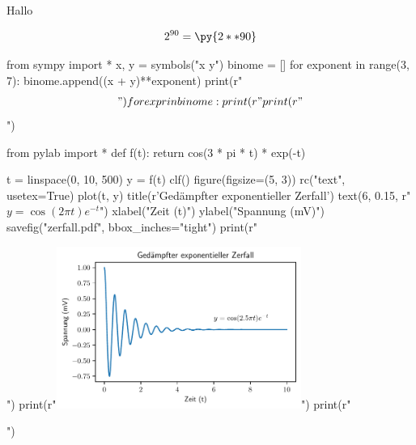 \documentclass[12pt,ngerman]{scrartcl}
\begin{document}
Hallo


\[
2^{90}=\py{2**90}
\]


\begin{pycode}
from sympy import *
x, y = symbols("x y")
binome = []
for exponent in range(3, 7):
    binome.append((x + y)**exponent)
    print(r"\begin{align*}")
    for expr in binome:
        print(r"%
    print(r"\end{align*}")
\end{pycode}

\begin{pycode}
from pylab import *
def f(t):
    return cos(3 * pi * t) * exp(-t)

t = linspace(0, 10, 500)
y = f(t)
clf()
figure(figsize=(5, 3))
rc("text", usetex=True)
plot(t, y)
title(r'Ged\"ampfter exponentieller Zerfall') 
text(6, 0.15, r"$y = \cos(2 \pi t) e^{-t}$")
xlabel("Zeit (t)")
ylabel("Spannung (mV)")
savefig("zerfall.pdf", bbox_inches="tight")
print(r"\begin{center}")
print(r"\includegraphics[width=0.6\textwidth]{zerfall.pdf}")
print(r"\end{center}")
\end{pycode}
\end{document}
